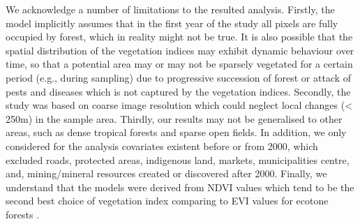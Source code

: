We acknowledge a number of limitations to the resulted analysis. Firstly, the model implicitly assumes that in the first year of the study all pixels are fully occupied by forest, which in reality might not be true. It is also possible that the spatial distribution of the vegetation indices may exhibit dynamic behaviour over time, so that a potential area may or may not be sparsely vegetated for a certain period (e.g., during sampling) due to progressive succession of forest or attack of pests and diseases which is not captured by the vegetation indices. Secondly, the study was based on coarse image resolution which could neglect local changes (< 250m) in the sample area. Thirdly, our results may not be generalised to other areas, such as dense tropical forests and sparse open fields. In addition, we only considered for the analysis covariates existent before or from 2000, which excluded roads, protected areas, indigenous land, markets, municipalities centre, and, mining/mineral resources created or discovered after 2000. Finally, we understand that the models were derived from NDVI values which tend to be the second best choice of vegetation index comparing to EVI values for ecotone forests \citep{ratana_huete_ferreira_2005,bayma_sano_2015,didan_munoz_2015}.

\let\cleardoublepage\clearpage
\begin{appendices} \label{appendix}
\renewcommand{\thechapter}{A.\arabic{chapter}}

\end{appendices}
 